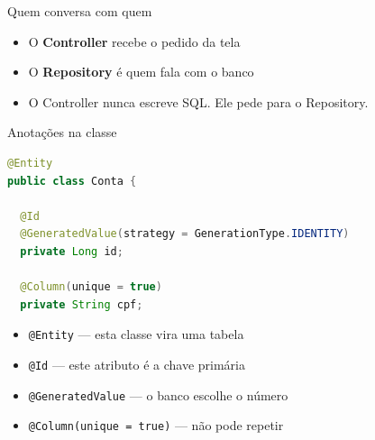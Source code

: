 \documentclass[aspectratio=169,11pt]{beamer}
\begin{document}
\begin{frame}{Quem conversa com quem}
  \begin{center}
  \end{center}

  \vspace{0.6em}
  \begin{itemize}
    \item O \textbf{Controller} recebe o pedido da tela
    \item O \textbf{Repository} é quem fala com o banco
    \item O Controller nunca escreve SQL. Ele pede para o Repository.
  \end{itemize}
\end{frame}

\begin{frame}[fragile]{Anotações na classe}
\begin{lstlisting}[language=Java,basicstyle=\ttfamily\footnotesize]
@Entity
public class Conta {

  @Id
  @GeneratedValue(strategy = GenerationType.IDENTITY)
  private Long id;

  @Column(unique = true)
  private String cpf;
\end{lstlisting}

  \begin{itemize}
    \item \texttt{@Entity} --- esta classe vira uma tabela
    \item \texttt{@Id} --- este atributo é a chave primária
    \item \texttt{@GeneratedValue} --- o banco escolhe o número
    \item \texttt{@Column(unique = true)} --- não pode repetir
  \end{itemize}
\end{frame}
\end{document}
